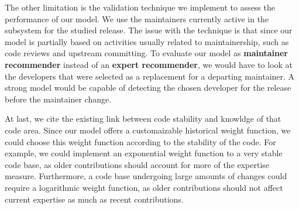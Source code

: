 The other limitation is the validation technique we implement to assess the performance of our model. We use the maintainers currently active in the subsystem for the studied release. The issue with the technique is that since our model is partially based on activities usually related to maintainership, such as code reviews and upstream committing. To evaluate our model as \textbf{maintainer recommender} instead of an \textbf{expert recommender}, we would have to look at the developers that were selected as a replacement for a departing maintainer. A strong model would be capable of detecting the chosen developer for the release before the maintainer change.

At last, we cite the existing link between code stability and knowldge of that code area. Since our model offers a customaizable historical weight function, we could choose this weight function according to the stability of the code. For example, we could implement an exponential weight function to a very stable code base, as older contributions should account for more of the expertise measure. Furthermore, a code base undergoing large amounts of changes could require a logarithmic weight function, as older contributions should not affect current expertise as much as recent contributions. 




